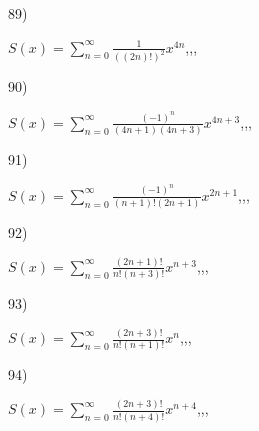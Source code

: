 \documentclass[11pt, ukrainian]{article}
\begin{document}
\par
\newpage
89) \space 
{%
{$S(x)=\sum\limits_{n=0}^{\infty}{\frac{1}{((2n)!)^2}}{x^{{4n}}}$},,, \par \smallskip  
}
\par
\vspace{0.9cm}
90) \space 
{%
{$S(x)=\sum\limits_{n=0}^{\infty}{\frac{(-1)^n}{(4n+1)(4n+3)}}{x^{{4n+3}}}$},,, \par \smallskip  
}
\par
\vspace{0.9cm}
91) \space 
{%
{$S(x)=\sum\limits_{n=0}^{\infty}{\frac{(-1)^n}{(n+1)!(2n+1)}}{x^{{2n+1}}}$},,, \par \smallskip  
}
\par
\vspace{0.9cm}
92) \space 
{%
{$S(x)=\sum\limits_{n=0}^{\infty}{\frac{(2n+1)!}{n!(n+3)!}}{x^{{n+3}}}$},,, \par \smallskip  
}
\par
\vspace{0.9cm}
93) \space 
{%
{$S(x)=\sum\limits_{n=0}^{\infty}{\frac{(2n+3)!}{n!(n+1)!}}{x^{n}}$},,, \par \smallskip  
}
\par
\vspace{0.9cm}
94) \space 
{%
{$S(x)=\sum\limits_{n=0}^{\infty}{\frac{(2n+3)!}{n!(n+4)!}}{x^{{n+4}}}$},,, \par \smallskip  
}
\end{document}

